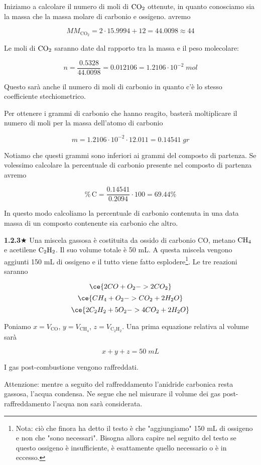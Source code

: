 Iniziamo a calcolare il numero di moli di $\rm CO_2$ ottenute, in quanto conosciamo sia la massa che la massa molare di carbonio e ossigeno. avremo

$$MM_{\text{CO}_2}=2 \cdot 15.9994 + 12 = 44.0098 \approx 44$$

Le moli di $\rm CO_2$ saranno date dal rapporto tra la massa e il peso molecolare:

$$n=\frac{0.5328}{44.0098}=0.012106=1.2106 \cdot 10^{-2} \; mol$$

Questo sarà anche il numero di moli di carbonio in quanto c'è lo stesso coefficiente stechiometrico.

Per ottenere i grammi di carbonio che hanno reagito, basterà moltiplicare il numero di moli per la massa dell'atomo di carbonio

$$m=1.2106 \cdot 10^{-2} \cdot 12.011=0.14541 \; gr$$

Notiamo che questi grammi sono inferiori ai grammi del composto di partenza. Se volessimo calcolare la percentuale di carbonio presente nel composto di partenza avremo

$$\%\,\text{C}=\frac{0.14541}{0.2094}\cdot 100 = 69.44 \%$$

In questo modo calcoliamo la percentuale di carbonio contenuta in una data massa di un composto contenente sia carbonio che altro.

\vspace{0.2cm}\textbf{1.2.3}$\bigstar$ Una miscela gassosa è costituita da ossido di carbonio CO, metano $\rm CH_4$ e acetilene $\rm C_2H_2$. Il suo volume totale è 50 mL. A questa miscela vengono aggiunti 150 mL di ossigeno e il tutto viene fatto esplodere\footnote{Nota: ciò che finora ha detto il testo è che "aggiungiamo" 150 mL di ossigeno e non che "sono necessari". Bisogna allora capire nel seguito del testo se questo ossigeno è insufficiente, è esattamente quello necessario o è in eccesso.}. Le tre reazioni saranno

$$\ce{2CO + O_2 -> 2CO_2}$$
$$\ce{CH_4 + O_2 -> CO_2 + 2H_2O}$$
$$\ce{2C_2H_2 + 5O_2 -> 4CO_2 + 2H_2O}$$

Poniamo $x=V_{\text{CO}}$, $y=V_{\text{CH}_4}$, $z=V_{\text{C}_2\text{H}_2}$. Una prima equazione relativa al volume sarà

$$x+y+z=50 \; mL$$

I gas post-combustione vengono raffreddati.

Attenzione: mentre a seguito del raffreddamento l'anidride carbonica resta gassosa, l'acqua condensa. Ne segue che nel misurare il volume dei gas post-raffreddamento l'acqua non sarà considerata.

